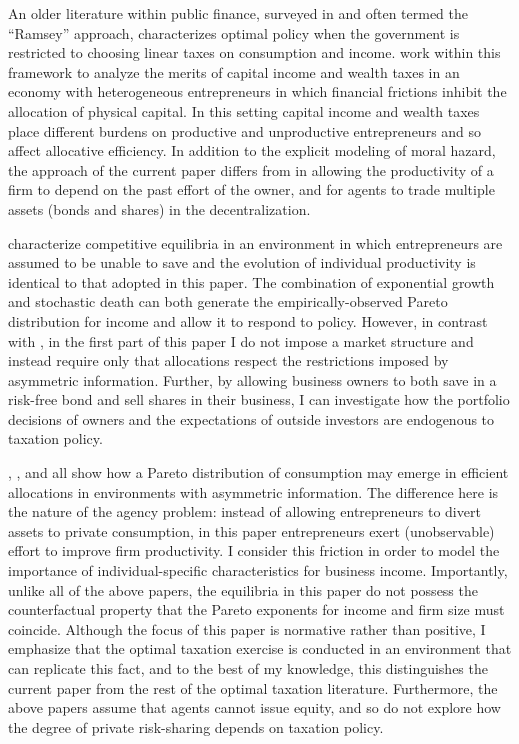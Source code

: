 \documentclass[11pt]{article}
\theoremstyle{plain}
\begin{document}
An older literature within public finance, surveyed in \cite{chari_optimal_1999} and often termed the ``Ramsey'' approach, characterizes optimal policy when the government is restricted to choosing linear taxes on consumption and income. \cite{guvenen_use_2019} work within this framework to analyze the merits of capital income and wealth taxes in an economy with heterogeneous entrepreneurs in which financial frictions inhibit the allocation of physical capital. In this setting capital income and wealth taxes place different burdens on productive and unproductive entrepreneurs and so affect allocative efficiency. In addition to the explicit modeling of moral hazard, the approach of the current paper differs from \cite{guvenen_use_2019} in allowing the productivity of a firm to depend on the past effort of the owner, and for agents to trade multiple assets (bonds and shares) in the decentralization.


\cite{jones_schumpeterian_2018} characterize competitive equilibria in an environment in which entrepreneurs are assumed to be unable to save and the evolution of individual productivity is identical to that adopted in this paper. The combination of exponential growth and stochastic death can both generate the empirically-observed Pareto distribution for income and allow it to respond to policy. However, in contrast with \cite{jones_schumpeterian_2018}, in the first part of this paper I do not impose a market structure and instead require only that allocations respect the restrictions imposed by asymmetric information. Further, by allowing business owners to both save in a risk-free bond and sell shares in their business, I can investigate how the portfolio decisions of owners and the expectations of outside investors are endogenous to taxation policy. 



\cite{ai_quantitative_2022}, \cite{shourideh_optimal_2013}, and \cite{phelan_optimality_2022} all show how a Pareto distribution of consumption may emerge in efficient allocations in environments with asymmetric information. The difference here is the nature of the agency problem: instead of allowing entrepreneurs to divert assets to private consumption, in this paper entrepreneurs exert (unobservable) effort to improve firm productivity. I consider this friction in order to model the importance of individual-specific characteristics for business income. Importantly, unlike all of the above papers, the equilibria in this paper do not possess the counterfactual property that the Pareto exponents for income and firm size must coincide. Although the focus of this paper is normative rather than positive, I emphasize that the optimal taxation exercise is conducted in an environment that can replicate this fact, and to the best of my knowledge, this distinguishes the current paper from the rest of the optimal taxation literature. Furthermore, the above papers assume that agents cannot issue equity, and so do not explore how the degree of private risk-sharing depends on taxation policy. 
\end{document}
